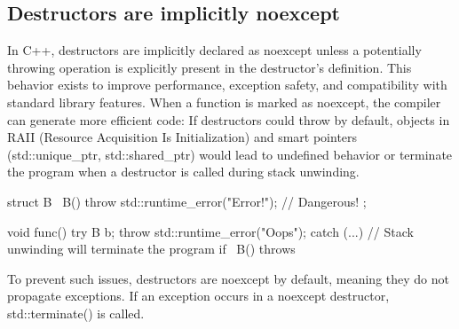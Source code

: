 \documentclass{report}
\begin{document}
    \subsection{Destructors are implicitly noexcept}
    \bigbreak \noindent 
    In C++, destructors are implicitly declared as noexcept unless a potentially throwing operation is explicitly present in the destructor's definition. This behavior exists to improve performance, exception safety, and compatibility with standard library features.
    \bigbreak \noindent 
    When a function is marked as noexcept, the compiler can generate more efficient code:
    \bigbreak \noindent 
    If destructors could throw by default, objects in RAII (Resource Acquisition Is Initialization) and smart pointers (std::unique_ptr, std::shared_ptr) would lead to undefined behavior or terminate the program when a destructor is called during stack unwinding.
    \bigbreak \noindent 
    \begin{cppcode}
        struct B {
            ~B() { throw std::runtime_error("Error!"); } // Dangerous!
        };

        void func() {
            try {
                B b;
                throw std::runtime_error("Oops");
            } catch (...) {
                // Stack unwinding will terminate the program if ~B() throws
            }
        }
    \end{cppcode}
    \bigbreak \noindent 
    To prevent such issues, destructors are noexcept by default, meaning they do not propagate exceptions. If an exception occurs in a noexcept destructor, std::terminate() is called.
    \bigbreak \noindent 

    \bigbreak \noindent 
\end{document}
